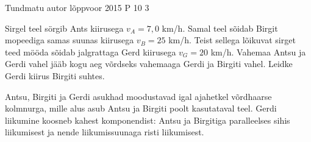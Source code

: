 {Tundmatu autor} %
{lõppvoor} %
{2015} %
{P 10} %
{3} %
{

\ifStatement
 Sirgel teel sörgib Ants kiirusega $v_A = 7,0$ km/h. Samal teel sõidab Birgit mopeediga samas suunas kiirusega $v_B = 25$ km/h. Teist sellega lõikuvat sirget teed mööda sõidab jalgrattaga Gerd kiirusega $v_G = 20$ km/h. Vahemaa Antsu ja Gerdi vahel jääb kogu aeg võrdseks vahemaaga Gerdi ja Birgiti vahel. Leidke Gerdi kiirus Birgiti suhtes.
\fi

\ifHint
Antsu, Birgiti ja Gerdi asukhad moodustavad igal ajahetkel võrdhaarse kolmnurga, mille alus asub Antsu ja Birgiti poolt kasutataval teel. Gerdi liikumine koosneb kahest komponendist: Antsu ja Birgitiga paralleelses sihis liikumisest ja nende liikumissuunaga risti liikumisest.
\fi

}
